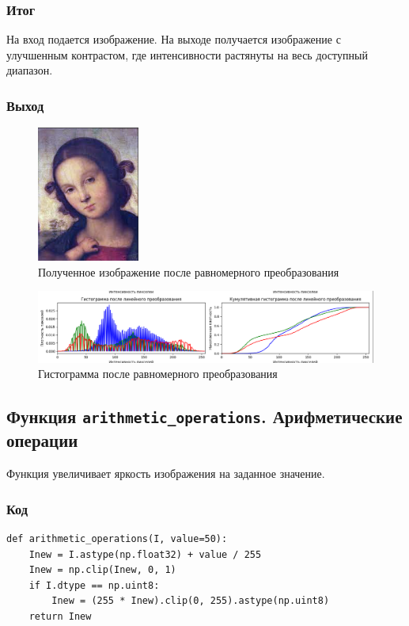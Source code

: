 \documentclass[a4paper,12pt]{article}
\begin{document}
\subsubsection{Итог}
На вход подается изображение. На выходе получается изображение с улучшенным контрастом, где интенсивности растянуты на весь доступный диапазон.

\subsubsection{Выход}

\begin{figure}[H]
    \centering
    \includegraphics[width=0.3\textwidth]{im/imРастяжение.png}
    \caption{Полученное изображение после равномерного преобразования}
    \label{fig:uniform_image}
\end{figure}

\begin{figure}[H]
    \centering
    \includegraphics[width=1\textwidth]{im/гистограммаРастяжение.png}
    \caption{Гистограмма после равномерного преобразования}
    \label{fig:uniform_histogram}
\end{figure}



\subsection{Функция \texttt{arithmetic\_operations}. Арифметические операции}

Функция увеличивает яркость изображения на заданное значение.

\subsubsection{Код}
\begin{verbatim}
def arithmetic_operations(I, value=50):
    Inew = I.astype(np.float32) + value / 255
    Inew = np.clip(Inew, 0, 1)
    if I.dtype == np.uint8:
        Inew = (255 * Inew).clip(0, 255).astype(np.uint8)
    return Inew
\end{verbatim}
\end{document}
